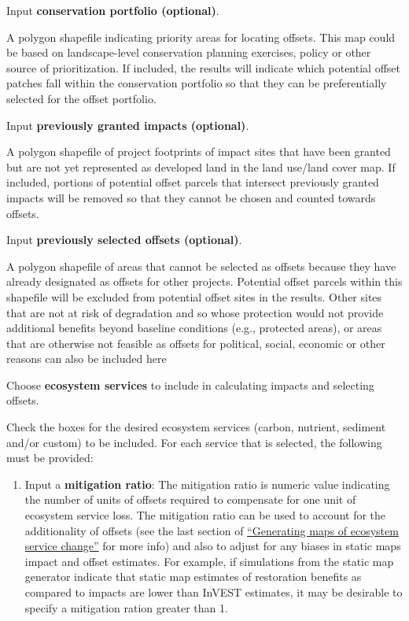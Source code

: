 \documentclass[11pt,letterpaper]{report}
\newenvironment{myenumerate}{%
	\edef\backupindent{\the\parindent}
	\enumerate
	\setlength{\parindent}{\backupindent}
		\setlist[enumerate,1]{label=(\arabic*)}
		\setlist[enumerate,2]{label=(\arabic*)}
}{\endenumerate}
\begin{document}
\begin{myenumerate}
		\item Input \textbf{conservation portfolio (optional)}.
		
			A polygon shapefile indicating priority areas for locating offsets. This map could be based on landscape-level conservation planning exercises, policy or other source of prioritization. If included, the results will indicate which potential offset patches fall within the conservation portfolio so that they can be preferentially selected for the offset portfolio.
		
		\item Input \textbf{previously granted impacts (optional)}.
	
			A polygon shapefile of project footprints of impact sites that have been granted but are not yet represented as developed land in the land use/land cover map. If included, portions of potential offset parcels that intersect previously granted impacts will be removed so that they cannot be chosen and counted towards offsets.
				
		\item Input \textbf{previously selected offsets (optional)}.
		
			A polygon shapefile of areas that cannot be selected as offsets because they have already designated as offsets for other projects. Potential offset parcels within this shapefile will be excluded from potential offset sites in the results. Other sites that are not at risk of degradation and so whose protection would not provide additional benefits beyond baseline conditions (e.g., protected areas), or areas that are otherwise not feasible as offsets for political, social, economic or other reasons can also be included here
		
		\item Choose \textbf{ecosystem services} to include in calculating impacts and selecting offsets.
		
			Check the boxes for the desired ecosystem services (carbon, nutrient, sediment and/or custom) to be included. For each service that is selected, the following must be provided:
			
			\begin{enumerate}[label=\alph*.]
				
				\item Input a \textbf{mitigation ratio}: The mitigation ratio is numeric value indicating the number of units of offsets required to compensate for one unit of ecosystem service loss. The mitigation ratio can be used to account for the additionality of offsets (see the last section of \hyperref[ch:maps]{``Generating maps of ecosystem service change''} for more info) and also to adjust for any biases in static maps impact and offset estimates. For example, if simulations from the static map generator indicate that static map estimates of restoration benefits as compared to impacts are lower than InVEST estimates, it may be desirable to specify a mitigation ration greater than 1.
				

\end{enumerate}
\end{myenumerate}
\end{document}
